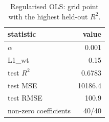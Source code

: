 \begin{table}[htbp]
\centering
\caption{Regularised OLS: grid point with the highest held-out $R^2$.}\label{tab:reg-best}
\begin{tabular}{lr}
\toprule
statistic & value \\
\midrule
$\alpha$ & 0.001 \\
L1\_wt & 0.15 \\
test $R^2$ & 0.6783 \\
test MSE & 10186.4 \\
test RMSE & 100.9 \\
non-zero coefficients & 40/40 \\
\bottomrule
\end{tabular}
\end{table}
